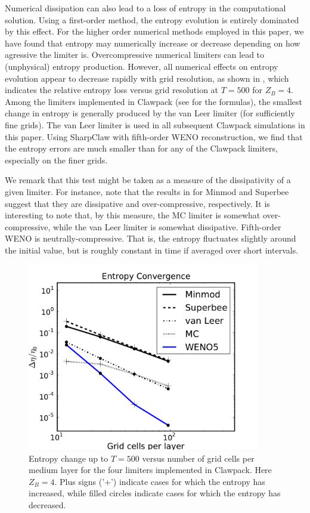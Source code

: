 Numerical dissipation can also lead to a loss of entropy in the 
computational solution.  Using a first-order method, the entropy evolution
is entirely dominated by this effect.  For the higher order numerical
methods employed in this paper, we have found that entropy may 
numerically increase or decrease
depending on how agressive the limiter is.  Overcompressive numerical 
limiters can lead to (unphysical) entropy production.  However, all
numerical effects on entropy evolution appear to decrease rapidly
with grid resolution, as shown in , which indicates
the relative entropy loss versus grid resolution at $T=500$ for $Z_B=4$.
Among the limiters implemented in Clawpack  (see \cite{rjl:fvmhp} for the
formulas), the smallest change 
in entropy is generally produced by the van Leer limiter (for sufficiently
fine grids).
The van Leer limiter is used in all subsequent Clawpack simulations 
in this paper.  Using SharpClaw with fifth-order WENO reconstruction, 
we find that the entropy errors are much smaller than for any of the 
Clawpack limiters, especially on the finer grids.

We remark that this test might be taken as a measure of the 
 dissipativity of a given limiter.  For instance, note that
the results in  for Minmod and Superbee suggest that
they are dissipative and over-compressive, respectively.
It is interesting to note that, by this measure, the MC limiter
is somewhat over-compressive, while the van Leer limiter is somewhat
dissipative. Fifth-order WENO is neutrally-compressive.  That is, the
entropy fluctuates slightly around the initial value, but is roughly constant
in time if averaged over short intervals.

\begin{figure}
\centerline{
\includegraphics[width=4in]{figures/limiter_entropy_convergence.pdf}}
\caption{Entropy change up to $T=500$ versus number of grid cells per
medium layer for the four limiters implemented in Clawpack.  Here $Z_B=4$.
Plus signs ('+') indicate cases for which the entropy has increased, while
filled circles
indicate cases for which the entropy has decreased.\label{fig:entropy_lims}}
\end{figure}

